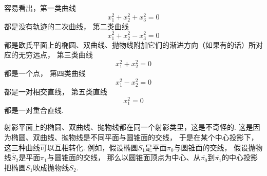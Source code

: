 容易看出，第一类曲线\begin{equation*}
	x_1^2 + x_2^2 + x_3^2 = 0
\end{equation*}
都是没有轨迹的二次曲线，
第二类曲线\begin{equation*}
	x_1^2 + x_2^2 - x_3^2 = 0
\end{equation*}
都是欧氏平面上的椭圆、双曲线、抛物线附加它们的渐进方向（如果有的话）所对应的无穷远点，
第三类曲线\begin{equation*}
	x_1^2 + x_2^2 = 0
\end{equation*}
都是一个点，
第四类曲线\begin{equation*}
	x_1^2 - x_2^2 = 0
\end{equation*}
都是一对相交直线，
第五类直线\begin{equation*}
	x_1^2 = 0
\end{equation*}
都是一对重合直线.

射影平面上的椭圆、双曲线、抛物线都在同一个射影类里，这是不奇怪的.
这是因为椭圆、双曲线、抛物线是不同平面与圆锥面的交线，
于是在某个中心投影下，这三种曲线可以互相转化.
例如，假设椭圆\(\overline{S}_1\)是平面\(\pi_0\)与圆锥面的交线，
假设抛物线\(\overline{S}_2\)是平面\(\pi_1\)与圆锥面的交线，
那么以圆锥面顶点为中心、从\(\overline{\pi_0}\)到\(\overline{\pi_1}\)的中心投影
把椭圆\(\overline{S}_1\)映成抛物线\(\overline{S}_2\).
